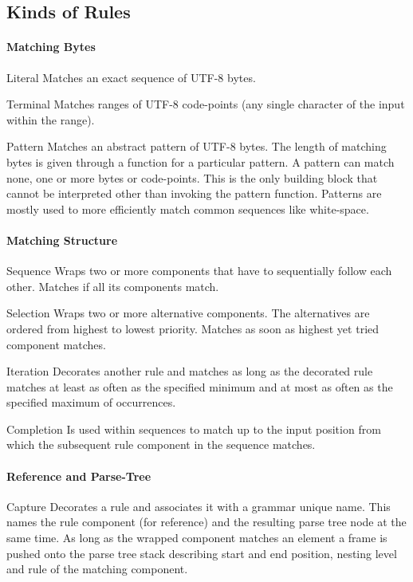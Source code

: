 \documentclass[10pt,a4paper]{article}
\begin{document}
\subsection{Kinds of Rules}
\paragraph{Matching Bytes}
\begin{rulelist}
\item[Literal] Matches an exact sequence of UTF-8 bytes.

\item[Terminal] Matches ranges of UTF-8 code-points (any single character of the input within the range).

\item[Pattern] Matches an abstract pattern of UTF-8 bytes. The length of matching bytes is given through a function for a particular pattern. A pattern can match none, one or more bytes or code-points. This is the only building block that cannot be interpreted other than invoking the pattern function. Patterns are mostly used to more efficiently match common sequences like white-space.
\end{rulelist}

\paragraph{Matching Structure}
\begin{rulelist}
\item[Sequence] Wraps two or more components that have to sequentially follow each other. Matches if all its components match.

\item[Selection] Wraps two or more alternative components. The alternatives are ordered from highest to lowest priority. Matches as soon as highest yet tried component matches.

\item[Iteration] Decorates another rule and matches as long as the decorated rule matches at least as often as the specified minimum and at most as often as the specified maximum of occurrences.

\item[Completion] Is used within sequences to match up to the input position from which the subsequent rule component in the sequence matches.
\end{rulelist}

\paragraph{Reference and Parse-Tree}
\begin{rulelist}
\item[Capture] Decorates a rule and associates it with a grammar unique name. This names the rule component (for reference) and the resulting parse tree node at the same time. As long as the wrapped component matches an element a frame is pushed onto the parse tree stack describing start and end position, nesting level and rule of the matching component.
\end{rulelist}
\end{document}
